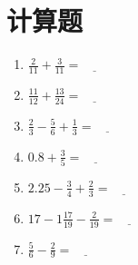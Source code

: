 \documentclass[DIN, pagenumber=false, fontsize=11pt, parskip=half]{scrartcl}
\begin{document}
\section{计算题}
\begin{enumerate}
    \item \(\frac{2}{11} + \frac{3}{11} = \underline{\qquad}\)
    \item \(\frac{11}{12} + \frac{13}{24} = \underline{\qquad}\)
    \item \(\frac{2}{3} - \frac{5}{6}+\frac{1}{3} = \underline{\qquad}\)
    \item \(0.8 + \frac{3}{5} = \underline{\qquad}\)
    \item \(2.25 - \frac{3}{4}+ \frac{2}{3}  = \underline{\qquad}\)
    \item \(17 - 1\frac{17}{19}- \frac{2}{19}  = \underline{\qquad}\)
    \item \(\frac{5}{6}- \frac{2}{9}  = \underline{\qquad}\)
   
\end{enumerate}
\end{document}
